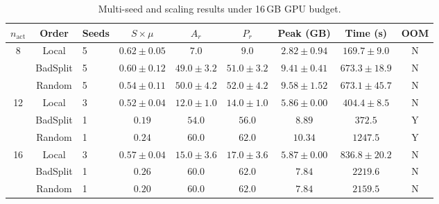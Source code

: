 \begin{table}[t]
\centering
\caption{Multi-seed and scaling results under 16\,GB GPU budget.}
\label{tab:scaling}
\small
\begin{tabular}{cclcccccc}
\toprule
$n_{\text{act}}$ & Order & Seeds & $S\times\mu$ & $A_r$ & $P_r$ & Peak (GB) & Time (s) & OOM \\
\midrule
\multirow{3}{*}{8} & Local & 5 & $0.62 \pm 0.05$ & $7.0$ & $9.0$ & $2.82 \pm 0.94$ & $169.7 \pm 9.0$ & N \\
 & BadSplit & 5 & $0.60 \pm 0.12$ & $49.0 \pm 3.2$ & $51.0 \pm 3.2$ & $9.41 \pm 0.41$ & $673.3 \pm 18.9$ & N \\
 & Random & 5 & $0.54 \pm 0.11$ & $50.0 \pm 4.2$ & $52.0 \pm 4.2$ & $9.58 \pm 1.52$ & $673.1 \pm 45.7$ & N \\
\cmidrule{2-9}
\multirow{3}{*}{12} & Local & 3 & $0.52 \pm 0.04$ & $12.0 \pm 1.0$ & $14.0 \pm 1.0$ & $5.86 \pm 0.00$ & $404.4 \pm 8.5$ & N \\
 & BadSplit & 1 & $0.19$ & $54.0$ & $56.0$ & $8.89$ & $372.5$ & Y \\
 & Random & 1 & $0.24$ & $60.0$ & $62.0$ & $10.34$ & $1247.5$ & Y \\
\cmidrule{2-9}
\multirow{3}{*}{16} & Local & 3 & $0.57 \pm 0.04$ & $15.0 \pm 3.6$ & $17.0 \pm 3.6$ & $5.87 \pm 0.00$ & $836.8 \pm 20.2$ & N \\
 & BadSplit & 1 & $0.26$ & $60.0$ & $62.0$ & $7.84$ & $2219.6$ & N \\
 & Random & 1 & $0.20$ & $60.0$ & $62.0$ & $7.84$ & $2159.5$ & N \\
\bottomrule
\end{tabular}
\end{table}